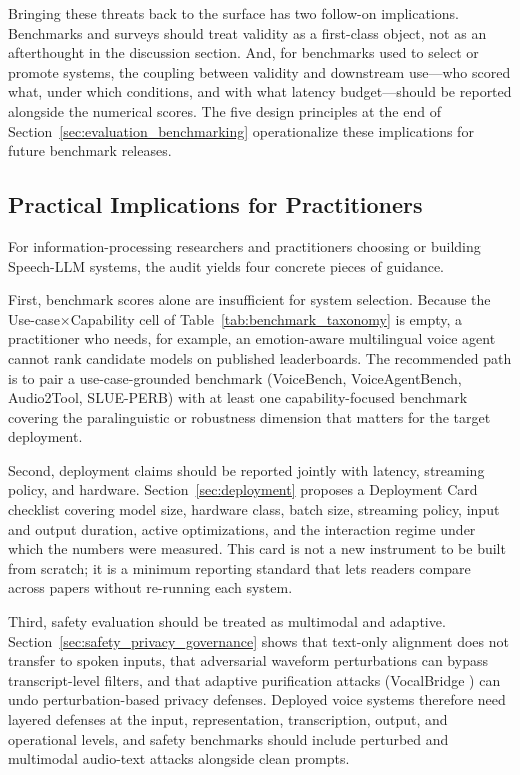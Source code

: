 Bringing these threats back to the surface has two follow-on
implications. Benchmarks and surveys should treat validity as a
first-class object, not as an afterthought in the discussion section.
And, for benchmarks used to select or promote systems, the coupling
between validity and downstream use---who scored what, under which
conditions, and with what latency budget---should be reported
alongside the numerical scores. The five design principles at the end
of Section~\ref{sec:evaluation_benchmarking} operationalize these
implications for future benchmark releases.

\subsection{Practical Implications for Practitioners}
\label{subsec:discussion_practical}

For information-processing researchers and practitioners choosing or
building Speech-LLM systems, the audit yields four concrete pieces of
guidance.

First, benchmark scores alone are insufficient for system selection.
Because the Use-case$\times$Capability cell of
Table~\ref{tab:benchmark_taxonomy} is empty, a practitioner who needs,
for example, an emotion-aware multilingual voice agent cannot rank
candidate models on published leaderboards. The recommended path is
to pair a use-case-grounded benchmark (VoiceBench, VoiceAgentBench,
Audio2Tool, SLUE-PERB) with at least one capability-focused benchmark
covering the paralinguistic or robustness dimension that matters for
the target deployment.

Second, deployment claims should be reported jointly with latency,
streaming policy, and hardware. Section~\ref{sec:deployment} proposes
a Deployment Card checklist covering model size, hardware class,
batch size, streaming policy, input and output duration, active
optimizations, and the interaction regime under which the numbers
were measured. This card is not a new instrument to be built from
scratch; it is a minimum reporting standard that lets readers compare
across papers without re-running each system.

Third, safety evaluation should be treated as multimodal and adaptive.
Section~\ref{sec:safety_privacy_governance} shows that text-only
alignment does not transfer to spoken inputs, that adversarial
waveform perturbations can bypass transcript-level filters, and that
adaptive purification attacks (VocalBridge
\citep{abbasihafshejani2026vocalbridgelatentdiffusionbridgepurification})
can undo perturbation-based privacy defenses. Deployed voice systems
therefore need layered defenses at the input, representation,
transcription, output, and operational levels, and safety benchmarks
should include perturbed and multimodal audio-text attacks alongside
clean prompts.

